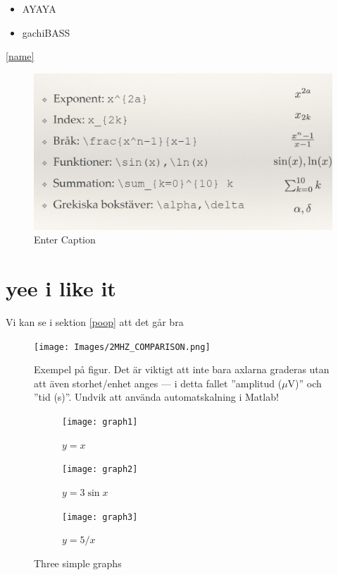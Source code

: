 \documentclass{article} %
\begin{document}
\begin{itemize}
\item AYAYA
\item gachiBASS
\end{itemize}



\label{name}
\ref{name} %



\begin{figure}
    \centering
    \includegraphics[width=0.6\linewidth]{randomImg.png}
    \caption{Enter Caption}
    \label{fig:enter-label}
\end{figure}

\section{yee i like it}
Vi kan se i sektion \ref{poop} att det går bra

\begin{figure}[h]
\begin{center}
\texttt{[image: Images/2MHZ\_COMPARISON.png]} %
\caption{Exempel på figur. Det är viktigt att inte bara axlarna graderas utan att även storhet/enhet anges --- i detta fallet ''amplitud ($\mu$V)'' och ''tid (s)''. Undvik att använda automatskalning i Matlab!}
\label{figExempelSignal}
\end{center}
\end{figure}

\begin{figure}
     \centering
     \begin{subfigure}[b]{0.3\textwidth}
         \centering
         \texttt{[image: graph1]}
         \caption{$y=x$}
         \label{fig:y equals x}
     \end{subfigure}
     \hfill
     \begin{subfigure}[b]{0.3\textwidth}
         \centering
         \texttt{[image: graph2]}
         \caption{$y=3\sin x$}
         \label{fig:three sin x}
     \end{subfigure}
     \hfill
     \begin{subfigure}[b]{0.3\textwidth}
         \centering
         \texttt{[image: graph3]}
         \caption{$y=5/x$}
         \label{fig:five over x}
     \end{subfigure}
        \caption{Three simple graphs}
        \label{fig:three graphs}
\end{figure}
\end{document}
